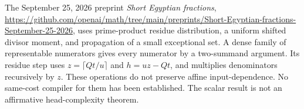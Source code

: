 \documentclass[11pt]{article}
\begin{document}
The September 25, 2026 preprint \emph{Short Egyptian fractions},
\url{https://github.com/openai/math/tree/main/preprints/Short-Egyptian-fractions-September-25-2026},
uses prime-product residue distribution, a uniform shifted divisor
moment, and propagation of a small exceptional set. A dense family
of representable numerators gives every numerator by a two-summand
argument. Its residue step uses
$z=\lceil Qt/u\rceil$ and $h=uz-Qt$, and multiplies denominators
recursively by $z$. These operations do not preserve affine
input-dependence. No same-cost compiler for them has been established.
The scalar result is not an affirmative head-complexity theorem.
\end{document}
